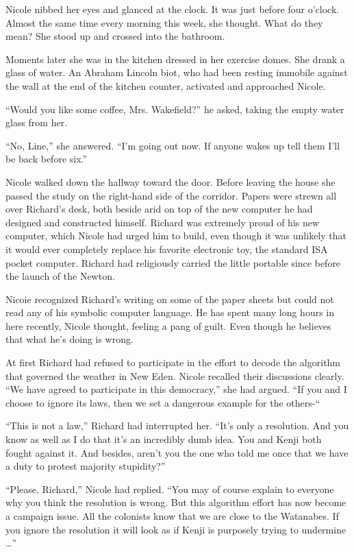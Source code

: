 \documentclass[]{article}
\begin{document}
{Nicole nibbed her eyes and glanced at the clock.  It was just before four o’clock.  Almost the same time every morning this week, she thought.  What do they mean? She stood up and crossed into the bathroom.

Moments later she was in the kitchen dressed in her exercise domes.  She drank a glass of water.  An Abraham Lincoln biot, who had been resting immobile against the wall at the end of the kitchen counter, activated and approached Nicole.

“Would you like some coffee, Mrs.  Wakefield?” he asked, taking the empty water glass from her.

“No, Line,” she answered.  “I’m going out now.  If anyone wakes up tell them I’ll be back before six.”

Nicole walked down the hallway toward the door.  Before leaving the house she passed the study on the right-hand side of the corridor.  Papers were strewn all over Richard’s desk, both beside arid on top of the new computer he had designed and constructed himself.  Richard was extremely proud of his new computer, which Nicole had urged him to build, even though it was unlikely that it would ever completely replace his favorite electronic toy, the standard ISA pocket computer.  Richard had religiously carried the little portable since before the launch of the Newton.

Nicoie recognized Richard’s writing on some of the paper sheets but could not read any of his symbolic computer language.  He has spent many long hours in here recently, Nicole thought, feeling a pang of guilt.  Even though he believes that what he’s doing is wrong.

At first Richard had refused to participate in the effort to decode the algorithm that governed the weather in New Eden.  Nicole recalled their discussions clearly.  “We have agreed to participate in this democracy,” she had argued.  “If you and I choose to ignore its laws, then we set a dangerous example for the others-“

“This is not a law,” Richard had interrupted her.  “It’s only a resolution.  And you know as well as I do that it’s an incredibly dumb idea.  You and Kenji both fought against it.  And besides, aren’t you the one who told me once that we have a duty to protest majority stupidity?”

“Please, Richard,” Nicole had replied.  “You may of course explain to everyone why you think the resolution is wrong.  But this algorithm effort has now become a campaign issue.  All the colonists know that we are close to the Watanabes.  If you ignore the resolution it will look as if Kenji is purposely trying to undermine …”

}
\end{document}
